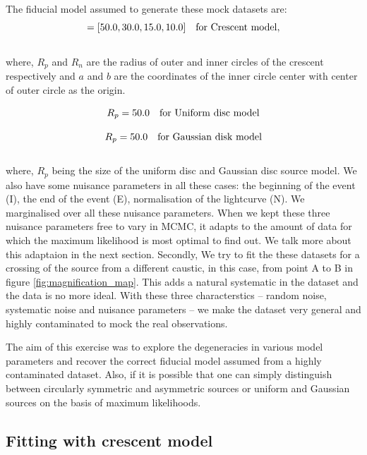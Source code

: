 The fiducial model assumed to generate these mock datasets are:
\begin{equation}
	[R_p, R_n, a, b] = [50.0, 30.0, 15.0, 10.0]  \ \ \ \rm{for\ Crescent\ model},
	\label{eqn:cp}
\end{equation}
\\
where, $R_p$ and $R_n$ are the radius of outer and inner circles of the crescent respectively and $a$ and $b$ are the coordinates of the inner circle center with center of outer circle as the origin.

\begin{equation}
	R_p = 50.0 \ \ \ \rm{for\ Uniform\ disc\ model}
\end{equation}

\begin{equation}
	R_p = 50.0 \ \ \ \rm{for\ Gaussian\ disk\ model}
\end{equation}
\\
where, $R_p$ being the size of the uniform disc and Gaussian disc source model. We also have some nuisance parameters in all these cases: the beginning of the event (I), the end of the event (E), normalisation of the lightcurve (N). We marginalised over all these nuisance parameters. When we kept these three nuisance parameters free to vary in MCMC, it adapts to the amount of data for which the maximum likelihood is most optimal to find out. We talk more about this adaptaion in the next section. Secondly, We try to fit the these datasets for a crossing of the source from a different caustic, in this case, from point A to B in figure \ref{fig:magnification_map}. This adds a natural systematic in the dataset and the data is no more ideal. With these three characterstics -- random noise, systematic noise and nuisance parameters -- we make the dataset very general and highly contaminated to mock the real observations.

The aim of this exercise was to explore the degeneracies in  various model parameters and recover the correct fiducial model assumed from a highly contaminated dataset. Also, if it is possible that one can simply distinguish between circularly symmetric and asymmetric sources or uniform and Gaussian sources on the basis of maximum likelihoods. 

\subsection{Fitting with crescent model}

